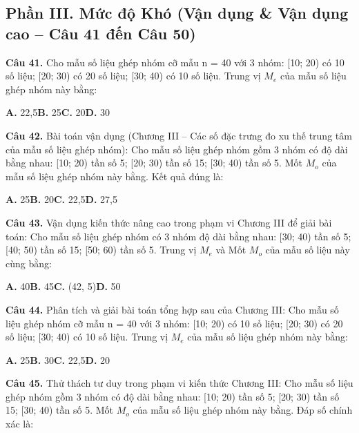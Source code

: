 \documentclass[11pt,a4paper]{article}
\begin{document}
\subsection*{\color{accent} Phần III. Mức độ Khó (Vận dụng \& Vận dụng cao -- Câu 41 đến Câu 50)}
\textbf{\color{primary} Câu 41.} Cho mẫu số liệu ghép nhóm cỡ mẫu n = 40 với 3 nhóm: [10; 20) có 10 số liệu; [20; 30) có 20 số liệu; [30; 40) có 10 số liệu. Trung vị $M_e$ của mẫu số liệu ghép nhóm này bằng:\par
\hspace*{1.5em}\textbf{A.} 22,5\quad\quad \textbf{B.} 25\quad\quad \textbf{C.} 20\quad\quad \textbf{D.} 30\par\vspace{2pt}
\textbf{\color{primary} Câu 42.} Bài toán vận dụng (Chương III – Các số đặc trưng đo xu thế trung tâm của mẫu số liệu ghép nhóm): Cho mẫu số liệu ghép nhóm gồm 3 nhóm có độ dài bằng nhau: [10; 20) tần số 5; [20; 30) tần số 15; [30; 40) tần số 5. Mốt $M_o$ của mẫu số liệu ghép nhóm này bằng. Kết quả đúng là:\par
\hspace*{1.5em}\textbf{A.} 25\quad\quad \textbf{B.} 20\quad\quad \textbf{C.} 22,5\quad\quad \textbf{D.} 27,5\par\vspace{2pt}
\textbf{\color{primary} Câu 43.} Vận dụng kiến thức nâng cao trong phạm vi Chương III để giải bài toán: Cho mẫu số liệu ghép nhóm có 3 nhóm độ dài bằng nhau: [30; 40) tần số 5; [40; 50) tần số 15; [50; 60) tần số 5. Trung vị $M_e$ và Mốt $M_o$ của mẫu số liệu này cùng bằng:\par
\hspace*{1.5em}\textbf{A.} 40\quad\quad \textbf{B.} 45\quad\quad \textbf{C.} (42, 5)\quad\quad \textbf{D.} 50\par\vspace{2pt}
\textbf{\color{primary} Câu 44.} Phân tích và giải bài toán tổng hợp sau của Chương III: Cho mẫu số liệu ghép nhóm cỡ mẫu n = 40 với 3 nhóm: [10; 20) có 10 số liệu; [20; 30) có 20 số liệu; [30; 40) có 10 số liệu. Trung vị $M_e$ của mẫu số liệu ghép nhóm này bằng:\par
\hspace*{1.5em}\textbf{A.} 25\quad\quad \textbf{B.} 30\quad\quad \textbf{C.} 22,5\quad\quad \textbf{D.} 20\par\vspace{2pt}
\textbf{\color{primary} Câu 45.} Thử thách tư duy trong phạm vi kiến thức Chương III: Cho mẫu số liệu ghép nhóm gồm 3 nhóm có độ dài bằng nhau: [10; 20) tần số 5; [20; 30) tần số 15; [30; 40) tần số 5. Mốt $M_o$ của mẫu số liệu ghép nhóm này bằng. Đáp số chính xác là:\par
\end{document}
